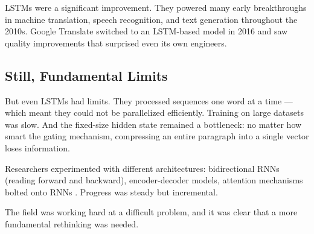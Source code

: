 LSTMs were a significant improvement.
They powered many early breakthroughs in machine translation, speech recognition, and text generation throughout the 2010s.
Google Translate switched to an LSTM-based model in 2016 \cite{wu2016google} and saw quality improvements that surprised even its own engineers.

\subsection{Still, Fundamental Limits}

But even LSTMs had limits.
They processed sequences one word at a time --- which meant they could not be parallelized efficiently.
Training on large datasets was slow.
And the fixed-size hidden state remained a bottleneck: no matter how smart the gating mechanism, compressing an entire paragraph into a single vector loses information.

Researchers experimented with different architectures: bidirectional RNNs (reading forward and backward), encoder-decoder models, attention mechanisms bolted onto RNNs \cite{bahdanau2014neural}.
Progress was steady but incremental.

The field was working hard at a difficult problem, and it was clear that a more fundamental rethinking was needed.
